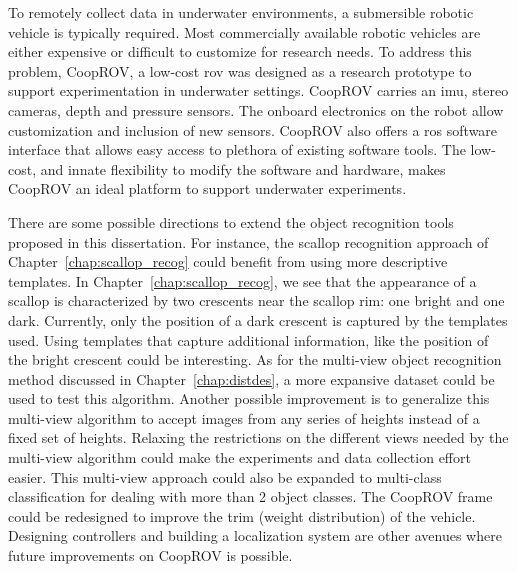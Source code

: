 \documentclass {udthesis}
\begin{document}
To remotely collect data in underwater environments, a submersible robotic vehicle is typically required.
Most commercially available robotic vehicles are either expensive or difficult to customize for research needs. To address this problem, CoopROV, a low-cost \gls{rov} was designed as a research prototype to support experimentation in underwater settings. CoopROV carries an \gls{imu}, stereo cameras, depth and pressure sensors. The onboard electronics on the robot allow customization and inclusion of new sensors. CoopROV also offers a \gls{ros} software interface that allows easy access to plethora of existing software tools. The low-cost, and innate flexibility to modify the software and hardware, makes CoopROV an ideal platform to support underwater experiments.

There are some possible directions to extend the object recognition tools proposed in this dissertation. For instance, the scallop recognition approach of Chapter~\ref{chap:scallop_recog} could benefit from using more descriptive 
templates. In Chapter~\ref{chap:scallop_recog}, we see that the appearance of a scallop is characterized by two crescents near the scallop rim: one bright and one dark. Currently, only the position of a dark crescent is captured by the templates used. Using templates that capture additional information, like the position of the bright crescent could be interesting. As for the multi-view object recognition method discussed in Chapter~\ref{chap:distdes}, a more expansive dataset could be used to test this algorithm. Another possible improvement is to generalize this multi-view algorithm to accept images from any series of heights instead of a fixed set of heights. Relaxing the restrictions on the different views needed by the multi-view algorithm could make the experiments and data collection effort easier. This multi-view approach could also be expanded to multi-class classification for dealing with more than 2 object classes. The CoopROV frame could be redesigned to improve the trim (weight distribution) of 
the vehicle. Designing controllers and building a localization system are other avenues where future improvements on CoopROV is possible.
\end{document}
